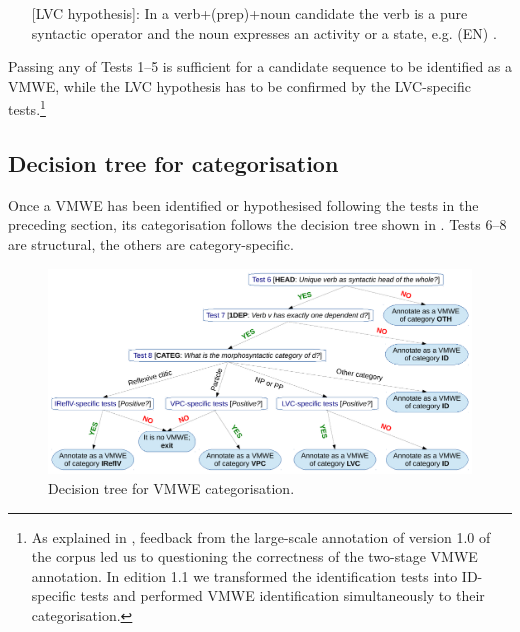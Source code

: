 \documentclass[output=paper,modfonts]{langscibook}
\begin{document}
\begin{itemize}
\item[][LVC hypothesis]: In a verb+(prep)+noun candidate the verb is a pure syntactic operator and the noun expresses an activity or a state, e.g. (EN) .
\end{itemize}
Passing any of Tests 1--5 is sufficient for a candidate sequence to be identified as a VMWE, while the LVC hypothesis has to be confirmed by the LVC-specific tests.\footnote{As explained in , feedback from the large-scale annotation of version 1.0 of the corpus led us to questioning the correctness of the two-stage VMWE annotation. In edition 1.1 we transformed the identification tests into ID-specific tests and performed VMWE identification simultaneously to their categorisation.}

\subsection{Decision tree for categorisation}
\label{sec:decision-tree}
%
Once a VMWE has been identified or hypothesised following the tests in the preceding section, its categorisation follows the decision tree shown in . Tests 6--8 are structural, the others are category-specific.

\begin{figure}
\includegraphics[width=1\textwidth]{figures/decision-tree.pdf}
\caption{Decision tree for VMWE categorisation.}
\label{fig:decision-tree}
\end{figure}

\end{document}
